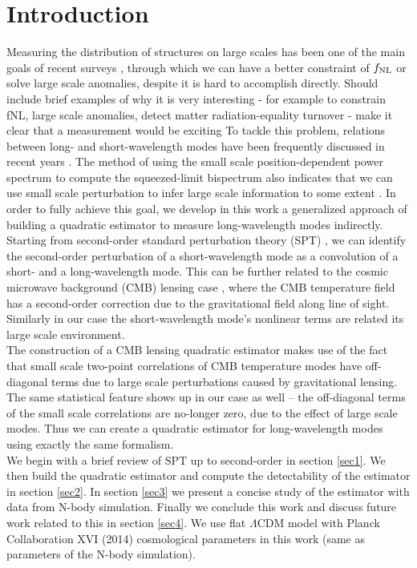 \documentclass[prd,amsmath,amssymb,floatfix,superscriptaddress,nofootinbib,twocolumn]{revtex4-1}
\newcommand{\peikai}[1]{{\color{blue} #1}}
\newcommand{\RC}[1]{{\color{darkorange} #1}}
\begin{document}
\section{Introduction}
Measuring the distribution of structures on large scales has been one of the main goals of recent surveys\peikai{, through which we can have a better constraint of $f_{\rm NL}$ or solve large scale anomalies,} despite it is hard to accomplish directly.\RC{Should include brief examples of why it is very interesting - for example to constrain fNL, large scale anomalies, detect matter radiation-equality turnover - make it clear that a measurement would be exciting} To tackle this problem, relations between long- and short-wavelength modes have been frequently discussed in recent years \cite{Baldauf:2011fer}\cite{Barreira:2017res}. The method of using the small scale position-dependent power spectrum to compute the squeezed-limit bispectrum also indicates that we can use small scale perturbation to infer large scale information to some extent \cite{Chiang:2014pos}\cite{Chiang:2015poss}. In order to fully achieve this goal, we develop in this work a generalized approach of building a quadratic estimator to measure long-wavelength modes indirectly. \\
Starting from second-order standard perturbation theory (SPT) \cite{Goroff:1986sts}\cite{Makino:1992fs}\cite{Jain:1994sop}, we can identify the second-order perturbation of a short-wavelength mode as a convolution of a short- and a long-wavelength mode. This can be further related to the cosmic microwave background (CMB) lensing case \cite{Hu:2002mr}, where the CMB temperature field has a second-order correction due to the gravitational field along line of sight. Similarly in our case the short-wavelength mode's nonlinear terms are related its large scale environment.\\
The construction of a CMB lensing quadratic estimator makes use of the fact that small scale two-point correlations of CMB temperature modes have off-diagonal terms due to large scale perturbations caused by gravitational lensing. The same statistical feature shows up in our case as well -- the off-diagonal terms of the small scale correlations are no-longer zero, due to the effect of large scale modes. Thus we can create a quadratic estimator for long-wavelength modes using exactly the same formalism. \\
We begin with a brief review of SPT up to second-order in section \ref{sec1}. We then build the quadratic estimator and compute the detectability of the estimator in section \ref{sec2}. In section \ref{sec3} we present a concise study of the estimator with data from N-body simulation. Finally we conclude this work and discuss future work related to this in section \ref{sec4}. We use flat $\Lambda$CDM model with Planck Collaboration XVI (2014) \cite{Planck:2014cos} cosmological parameters in this work (same as parameters of the N-body simulation).
\end{document}
